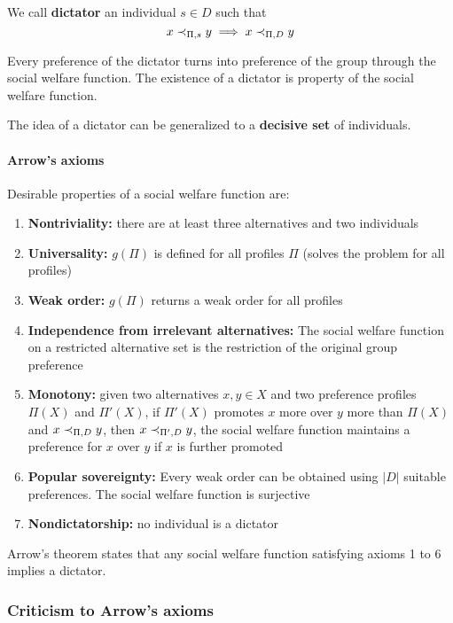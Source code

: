 We call \textbf{dictator} an individual $s \in D$ such that 
$$ x \prec_{\Pi, s} y \implies x \prec_{\Pi, D} y$$

Every preference of the dictator turns into preference of the group through the social welfare function. The existence of a dictator is property of the social welfare function.

The idea of a dictator can be generalized to a \textbf{decisive set} of individuals.

\paragraph{Arrow's axioms} Desirable properties of a social welfare function are: 
\begin{enumerate}
	\item \textbf{Nontriviality:} there are at least three alternatives and two individuals 
	
	\item \textbf{Universality:} $g(\Pi)$ is defined for all profiles $\Pi$ (solves the problem for all profiles)
	
	\item \textbf{Weak order:} $g(\Pi)$ returns a weak order for all profiles
	
	\item \textbf{Independence from irrelevant alternatives:} The social welfare function on a restricted alternative set is the restriction of the original group preference
	
	\item \textbf{Monotony:} given two alternatives $x,y \in X$ and two preference profiles $\Pi(X)$ and $\Pi'(X)$, if $\Pi'(X)$ promotes $x$ more over $y$ more than $\Pi(X)$ and $x \prec_{\Pi, D} y$, then $x \prec_{\Pi', D} y$, the social welfare function maintains a preference for $x$ over $y$ if $x$ is further promoted
	
	\item \textbf{Popular sovereignty:} Every weak order can be obtained using $|D|$ suitable preferences. The social welfare function is surjective
	
	\item \textbf{Nondictatorship:} no individual is a dictator
\end{enumerate}

Arrow's theorem states that any social welfare function satisfying axioms 1 to 6 implies a dictator.

\subsubsection{Criticism to Arrow's axioms}


